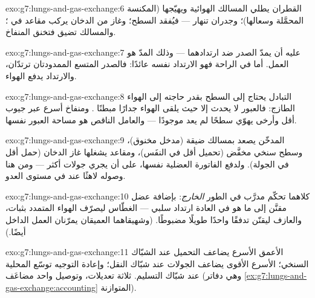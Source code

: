 \begin{solution}{exo:g7:lungs-and-gas-exchange:6}
القطران يطلي المسالك الهوائية ويهيّجها (المكنسة المحمَّلة وسعالها)؛
وجدران  تنهار --- فيُفقد السطح؛ وغاز من الدخان يركب مقاعد
 في ؛ والمسالك تضيق فتخنق المنفاخ.
\end{solution}

\begin{solution}{exo:g7:lungs-and-gas-exchange:7}
 عليه أن يمدّ الصدر  ضد ارتدادهما --- وذلك المدّ هو
العمل. أما  في الراحة فهو الارتداد نفسه عائدًا: فالصدر
المتسع  الممدودتان ترتدّان، والارتداد يدفع الهواء.
\end{solution}

\begin{solution}{exo:g7:lungs-and-gas-exchange:8}
التبادل يحتاج إلى السطح بقدر حاجته إلى الهواء الطازج: فالعبور لا
يحدث إلا حيث يلقى الهواء جدارًا مبطنًا . ومنفاخ أسرع عبر جيوب
أقل وأرخى يهوّي سطحًا لم يعد موجودًا --- والعامل الناقص هو مساحة
العبور نفسها.
\end{solution}

\begin{solution}{exo:g7:lungs-and-gas-exchange:9}
المدخّن يصعد بمسالك ضيقة (مدخل مخنوق)، وسطح سنخي مخفَّض (تحميل أقل
في النفَس)، ومقاعد  يشغلها غاز الدخان (حمل أقل في الجولة).
ولدفع الفاتورة العضلية نفسها، على  أن يجري جولات أكثر --- ومن
هنا وصوله لاهثًا عند  في مستوى العدو.
\end{solution}

\begin{solution}{exo:g7:lungs-and-gas-exchange:10}
كلاهما تحكّم مدرَّب في الطور \emph{الخارج}: بإضافة عضل مقنَّن إلى ما
هو في العادة ارتداد سلبي --- الغطّاس ليصرّف الهواء المتمدد بثبات،
والعازف ليقنّن تدفقًا واحدًا طويلًا مضبوطًا. (وشهيقاهما العميقان
يمرّنان العمل الداخل أيضًا.)
\end{solution}

\begin{solution}{exo:g7:lungs-and-gas-exchange:11}
 الأعمق الأسرع يضاعف التحميل عند الشبّاك السنخي؛ 
الأسرع الأقوى يضاعف الجولات عند شبّاك النقل؛ وإعادة التوجيه توسّع
  المحلية عند شبّاك التسليم. ثلاثة تعديلات، وتوصيل
واحد مضاعَف
(وهي دفاتر \cref{ex:g7:lungs-and-gas-exchange:accounting}
المتوازنة).
\end{solution}

